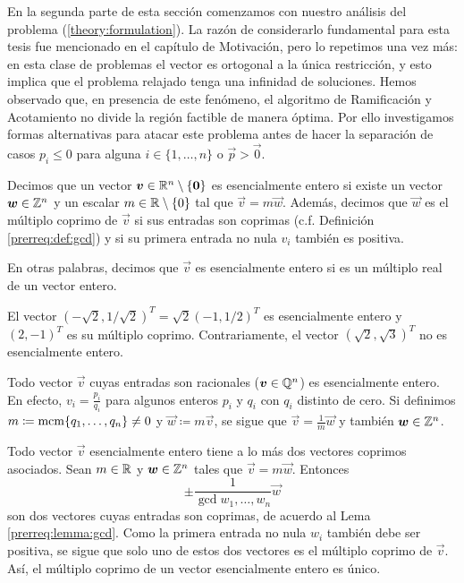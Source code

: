 En la segunda parte de esta sección comenzamos con nuestro análisis del problema
(\ref{theory:formulation}). La razón de considerarlo fundamental para esta tesis fue mencionado en
el capítulo de Motivación, pero lo repetimos una vez más: en esta clase de problemas el vector es
ortogonal a la única restricción, y esto implica que el problema relajado tenga una infinidad de
soluciones. Hemos observado que, en presencia de este fenómeno, el algoritmo de Ramificación y
Acotamiento no divide la región factible de manera óptima. Por ello investigamos formas alternativas
para atacar este problema antes de hacer la separación de casos $p_i \leq 0$ para alguna $i \in
\lbrace 1, \ldots, n \rbrace$ o $\vec{p} > \vec{0}$.
\begin{definition}
	\label{theory:def:rational}
	Decimos que un vector $\boldsymbol{v} \in \mathbb{R}^n \setminus \lbrace \boldsymbol{0} \rbrace$ es esencialmente
	entero si existe un vector $\boldsymbol{w} \in \mathbb{Z}^n$ y un escalar $m \in \mathbb{R} \setminus \lbrace 0
	\rbrace$ tal que $\vec{v} = m\vec{w}$. Además, decimos que $\vec{w}$ es el múltiplo coprimo de
	$\vec{v}$ si sus entradas son coprimas (c.f. Definición \ref{prerreq:def:gcd}) y si su primera
	entrada no nula $v_i$ también es positiva.
\end{definition}
En otras palabras, decimos que $\vec{v}$ es esencialmente entero si es un múltiplo real de un vector
entero.
\begin{example}
	El vector $\left(-\sqrt{2}, 1/\sqrt{2}\right)^T = \sqrt{2}(-1, 1/2)^T$ es esencialmente entero
	y $(2, -1)^T$ es su múltiplo coprimo. Contrariamente, el vector $(\sqrt{2}, \sqrt{3})^T$ no es
	esencialmente entero.
\end{example}
\begin{observation}
	Todo vector $\vec{v}$ cuyas entradas son racionales ($\boldsymbol{v} \in \mathbb{Q}^n$) es esencialmente
	entero. En efecto, $v_i = \frac{p_i}{q_i}$ para algunos enteros $p_i$ y $q_i$ con $q_i$
	distinto de cero. Si definimos $m \coloneq \mathop{\mathrm{mcm}{\left\lbrace q_1, \ldots, q_n \right\rbrace}} \neq 0$ y $\vec{w} \coloneq
	m\vec{v}$, se sigue que $\vec{v} = \frac{1}{m}\vec{w}$ y también $\boldsymbol{w} \in \mathbb{Z}^n$.
\end{observation}
\begin{observation}
	\label{obs:coprime-unique}
	Todo vector $\vec{v}$ esencialmente entero tiene a lo más dos vectores coprimos asociados. Sean
	$m \in \mathbb{R}$ y $\boldsymbol{w} \in \mathbb{Z}^n$ tales que $\vec{v} = m\vec{w}$. Entonces
	\begin{equation*}
		\pm \frac{1}{\gcd{w_1, \ldots, w_n}}\vec{w}
	\end{equation*}
	son dos vectores cuyas entradas son coprimas, de acuerdo al Lema \ref{prerreq:lemma:gcd}. Como
	la primera entrada no nula $w_i$ también debe ser positiva, se sigue que solo uno de estos dos
	vectores es el múltiplo coprimo de $\vec{v}$. Así, el múltiplo coprimo de un vector
	esencialmente entero es único.
\end{observation}

